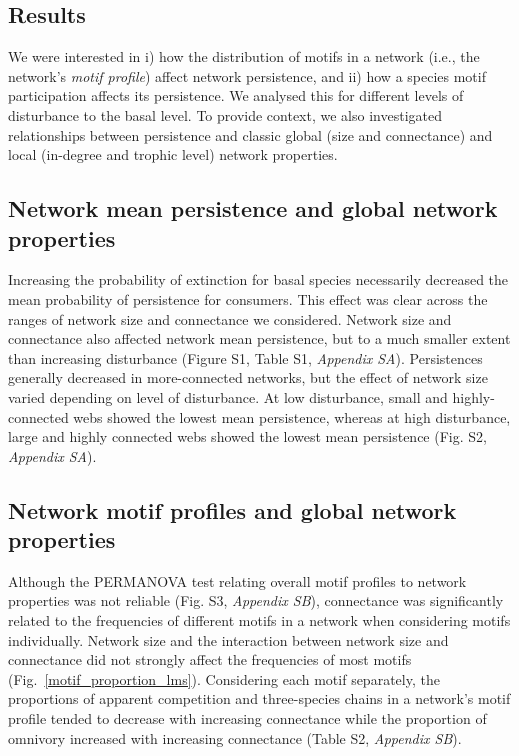 \documentclass[12pt]{article}
\begin{document}
\begin{spacing}{2.0}

\section*{Results}

    We were interested in i) how the distribution of motifs in a network (i.e., the network's \emph{motif profile}) affect network persistence, and ii) how a species motif participation affects its persistence. 
    We analysed this for different levels of disturbance to the basal level. 
    To provide context, we also investigated relationships between persistence and classic global (size and connectance) and local (in-degree and trophic level) network properties.

    
    \subsection*{Network mean persistence and global network properties}
    
        Increasing the probability of extinction for basal species necessarily decreased the mean probability of persistence for consumers. 
        This effect was clear across the ranges of network size and connectance we considered. 
        Network size and connectance also affected network mean persistence, but to a much smaller extent than increasing disturbance (Figure S1, Table S1, \emph{Appendix SA}). 
        Persistences generally decreased in more-connected networks, but the effect of network size varied depending on level of disturbance. 
        At low disturbance, small and highly-connected webs showed the lowest mean persistence, whereas at high disturbance, large and highly connected webs showed the lowest mean persistence (Fig. S2, \emph{Appendix SA}).

    \subsection*{Network motif profiles and global network properties}

        Although the PERMANOVA test relating overall motif profiles to network properties was not reliable (Fig. S3, \emph{Appendix SB}), 
        connectance was significantly related to the frequencies of different motifs in a network when considering motifs individually.
        Network size and the interaction between network size and connectance did not strongly affect the frequencies of most motifs (Fig.~\ref{motif_proportion_lms}).
        Considering each motif separately, the proportions of apparent competition and three-species chains in a network's motif profile tended to decrease with increasing connectance while the proportion of omnivory increased with increasing connectance (Table S2, \emph{Appendix SB}). 
    

\end{spacing}
\end{document}
